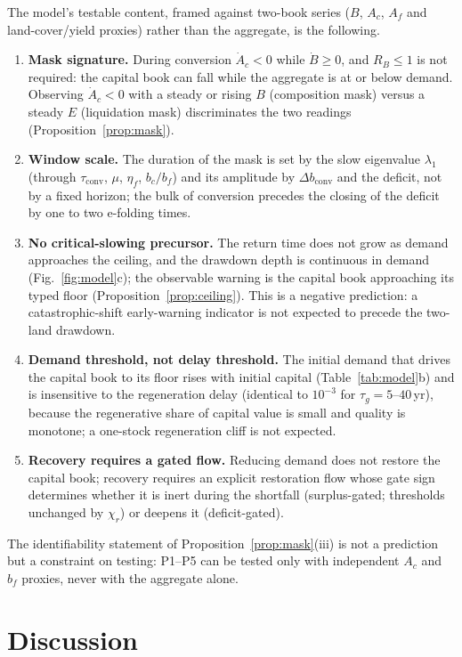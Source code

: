 \documentclass[preprint,12pt,authoryear]{elsarticle}
\newcommand{\dconv}{\Delta b_{\mathrm{conv}}}
\newcommand{\tconv}{\tau_{\mathrm{conv}}}
\begin{document}
The model's testable content, framed against two-book series ($B$, $A_c$, $A_f$ and land-cover/yield proxies) rather than the aggregate, is the following.
\begin{enumerate}[label=P\arabic*.,leftmargin=2.2em]
\item \textbf{Mask signature.} During conversion $\dot A_c<0$ while $\dot B\ge0$, and $R_B\le1$ is not required: the capital book can fall while the aggregate is at or below demand. Observing $\dot A_c<0$ with a steady or rising $B$ (composition mask) versus a steady $E$ (liquidation mask) discriminates the two readings (Proposition~\ref{prop:mask}).
\item \textbf{Window scale.} The duration of the mask is set by the slow eigenvalue $\lambda_1$ (through $\tconv$, $\mu$, $\eta_f$, $b_c/b_f$) and its amplitude by $\dconv$ and the deficit, not by a fixed horizon; the bulk of conversion precedes the closing of the deficit by one to two e-folding times.
\item \textbf{No critical-slowing precursor.} The return time does not grow as demand approaches the ceiling, and the drawdown depth is continuous in demand (Fig.~\ref{fig:model}c); the observable warning is the capital book approaching its typed floor (Proposition~\ref{prop:ceiling}). This is a negative prediction: a catastrophic-shift early-warning indicator is not expected to precede the two-land drawdown.
\item \textbf{Demand threshold, not delay threshold.} The initial demand that drives the capital book to its floor rises with initial capital (Table~\ref{tab:model}b) and is insensitive to the regeneration delay (identical to $10^{-3}$ for $\tau_g=5$--$40$\,yr), because the regenerative share of capital value is small and quality is monotone; a one-stock regeneration cliff is not expected.
\item \textbf{Recovery requires a gated flow.} Reducing demand does not restore the capital book; recovery requires an explicit restoration flow whose gate sign determines whether it is inert during the shortfall (surplus-gated; thresholds unchanged by $\chi_r$) or deepens it (deficit-gated).
\end{enumerate}
The identifiability statement of Proposition~\ref{prop:mask}(iii) is not a prediction but a constraint on testing: P1--P5 can be tested only with independent $A_c$ and $b_f$ proxies, never with the aggregate alone.
\section{Discussion}\label{sec:discussion}
\end{document}

